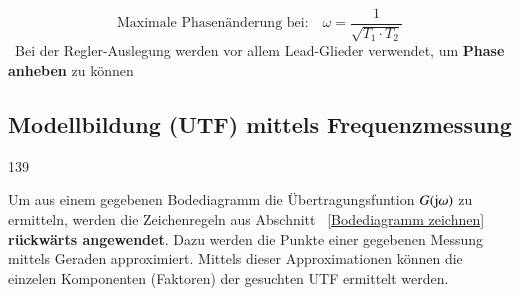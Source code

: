 $$ \boxed{ \text{Maximale Phasenänderung bei:} \quad \omega = \frac{1}{\sqrt{T_1 \cdot T_2}} } $$
\textrightarrow\ Bei der Regler-Auslegung werden vor allem Lead-Glieder verwendet, um \textbf{Phase anheben} zu können


\subsection{Modellbildung (UTF) mittels Frequenzmessung}{139}

Um aus einem gegebenen Bodediagramm die Übertragungsfuntion $G(\mathrm{j} \omega)$ zu ermitteln, werden die Zeichenregeln aus Abschnitt
~\ref{Bodediagramm zeichnen} \textbf{rückwärts angewendet}. Dazu werden die Punkte einer gegebenen Messung mittels Geraden approximiert.
Mittels dieser Approximationen können die einzelen Komponenten (Faktoren) der gesuchten UTF ermittelt werden.



